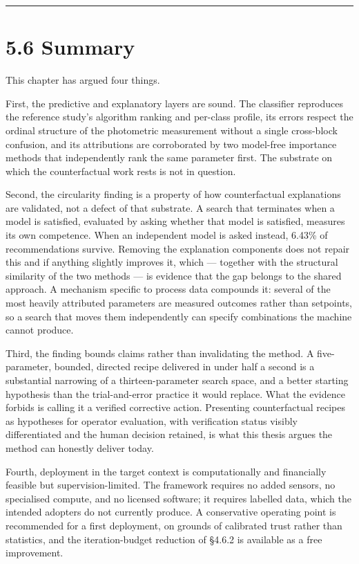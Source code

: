 \begin{center}\rule{0.5\linewidth}{0.5pt}\end{center}

\hypertarget{summary}{%
\section{5.6 Summary}\label{summary}}

This chapter has argued four things.

First, the predictive and explanatory layers are sound. The classifier reproduces the reference study's algorithm ranking and per-class profile, its errors respect the ordinal structure of the photometric measurement without a single cross-block confusion, and its attributions are corroborated by two model-free importance methods that independently rank the same parameter first. The substrate on which the counterfactual work rests is not in question.

Second, the circularity finding is a property of how counterfactual explanations are validated, not a defect of that substrate. A search that terminates when a model is satisfied, evaluated by asking whether that model is satisfied, measures its own competence. When an independent model is asked instead, 6.43\% of recommendations survive. Removing the explanation components does not repair this and if anything slightly improves it, which --- together with the structural similarity of the two methods --- is evidence that the gap belongs to the shared approach. A mechanism specific to process data compounds it: several of the most heavily attributed parameters are measured outcomes rather than setpoints, so a search that moves them independently can specify combinations the machine cannot produce.

Third, the finding bounds claims rather than invalidating the method. A five-parameter, bounded, directed recipe delivered in under half a second is a substantial narrowing of a thirteen-parameter search space, and a better starting hypothesis than the trial-and-error practice it would replace. What the evidence forbids is calling it a verified corrective action. Presenting counterfactual recipes as hypotheses for operator evaluation, with verification status visibly differentiated and the human decision retained, is what this thesis argues the method can honestly deliver today.

Fourth, deployment in the target context is computationally and financially feasible but supervision-limited. The framework requires no added sensors, no specialised compute, and no licensed software; it requires labelled data, which the intended adopters do not currently produce. A conservative operating point is recommended for a first deployment, on grounds of calibrated trust rather than statistics, and the iteration-budget reduction of §4.6.2 is available as a free improvement.

